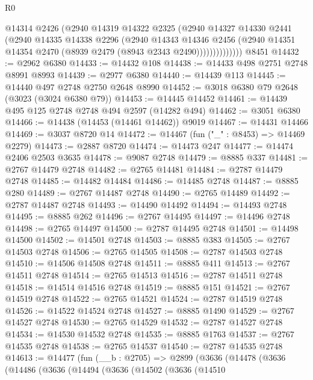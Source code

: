 \begin{lexlean}{R0}
\begin{coremodule}
                  @14314
                  @2426
                  (@2940
                    @14319
                    @14322
                    @2325
                    (@2940
                      @14327
                      @14330
                      @2441
                      (@2940
                        @14335
                        @14338
                        @2296
                        (@2940
                          @14343
                          @14346
                          @2456
                          (@2940 @14351 @14354 @2470 (@8939 @2479 (@8943 @2343 @2490))))))))))))))
    @8451
@14432 := @2962 @6380
@14433 := @14432 @108
@14438 := @14433 @498 @2751 @2748 @8991 @8993
@14439 := @2977 @6380
@14440 := @14439 @113
@14445 := @14440 @497 @2748 @2750 @2648 @8990
@14452 := @3018 @6380 @79 @2648 (@3023 (@3024 @6380 @79))
@14453 := @14445 @14452
@14461 := @14439 @495 @125 @2748 @2748 @494 @2597 (@14282 @494)
@14462 := @3051 @6380
@14466 := @14438 (@14453 (@14461 @14462)) @9019
@14467 := @14431 @14466
@14469 := @3037 @8720 @14
@14472 := @14467 (fun ("_" : @8453) => @14469 @2279)
@14473 := @2887 @8720
@14474 := @14473 @247
@14477 := @14474 @2406 @2503 @3635
@14478 := @9087 @2748
@14479 := @8885 @337
@14481 := @2767 @14479 @2748
@14482 := @2765 @14481
@14484 := @2787 @14479 @2748
@14485 := @14482 @14484
@14486 := @14485 @2748
@14487 := @8885 @280
@14489 := @2767 @14487 @2748
@14490 := @2765 @14489
@14492 := @2787 @14487 @2748
@14493 := @14490 @14492
@14494 := @14493 @2748
@14495 := @8885 @262
@14496 := @2767 @14495
@14497 := @14496 @2748
@14498 := @2765 @14497
@14500 := @2787 @14495 @2748
@14501 := @14498 @14500
@14502 := @14501 @2748
@14503 := @8885 @383
@14505 := @2767 @14503 @2748
@14506 := @2765 @14505
@14508 := @2787 @14503 @2748
@14510 := @14506 @14508 @2748
@14511 := @8885 @411
@14513 := @2767 @14511 @2748
@14514 := @2765 @14513
@14516 := @2787 @14511 @2748
@14518 := @14514 @14516 @2748
@14519 := @8885 @151
@14521 := @2767 @14519 @2748
@14522 := @2765 @14521
@14524 := @2787 @14519 @2748
@14526 := @14522 @14524 @2748
@14527 := @8885 @1490
@14529 := @2767 @14527 @2748
@14530 := @2765 @14529
@14532 := @2787 @14527 @2748
@14534 := @14530 @14532 @2748
@14535 := @8885 @1763
@14537 := @2767 @14535 @2748
@14538 := @2765 @14537
@14540 := @2787 @14535 @2748
@14613 := @14477
    (fun (__b : @2705) =>
    @2899
      (@3636
        (@14478
          (@3636
            (@14486
              (@3636
                (@14494
                  (@3636
                    (@14502
                      (@3636
                        (@14510

\end{coremodule}
\end{lexlean}
